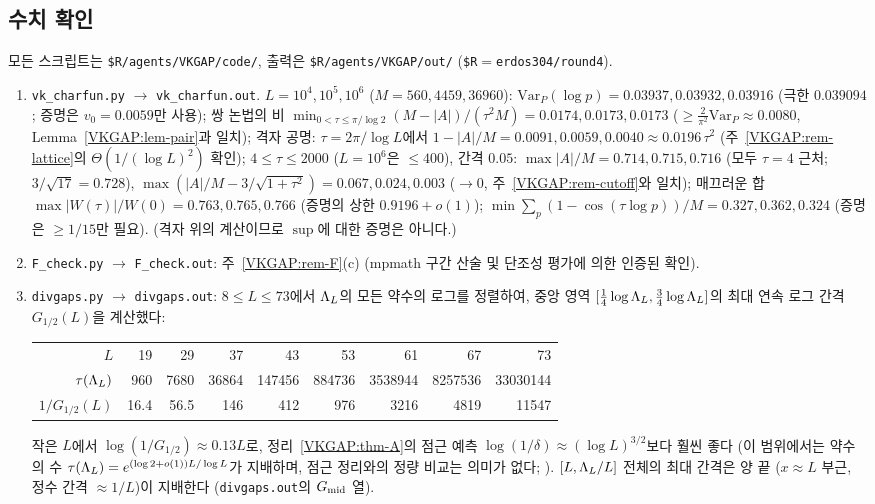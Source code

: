 \subsection{수치 확인}
\label{VKGAP:sec-num}

모든 스크립트는 \texttt{\$R/agents/VKGAP/code/}, 출력은 \texttt{\$R/agents/VKGAP/out/} (\texttt{\$R}$=$\texttt{erdos304/round4}).
\begin{enumerate}[label=(N\arabic*)]
\item \NUMERIC{} \texttt{vk\_charfun.py} $\to$ \texttt{vk\_charfun.out}. $L=10^4,10^5,10^6$ ($M=560,4459,36960$):
$\mathrm{Var}_P(\log p)=0.03937,0.03932,0.03916$ (극한 $0.039094$; 증명은 $v_0=0.0059$만 사용);
쌍 논법의 비 $\min_{0<\tau\le\pi/\log2}(M-|A|)/(\tau^2M)=0.0174,0.0173,0.0173$ ($\ge\frac2{\pi^2}\mathrm{Var}_P\approx0.0080$, Lemma~\ref{VKGAP:lem-pair}과 일치);
격자 공명: $\tau=2\pi/\log L$에서 $1-|A|/M=0.0091,0.0059,0.0040\approx0.0196\,\tau^2$ (주~\ref{VKGAP:rem-lattice}의 $\Theta(1/(\log L)^2)$ 확인);
$4\le\tau\le2000$ ($L=10^6$은 $\le400$), 간격 $0.05$: $\max|A|/M=0.714,0.715,0.716$ (모두 $\tau=4$ 근처; $3/\sqrt{17}=0.728$),
$\max(|A|/M-3/\sqrt{1+\tau^2})=0.067,0.024,0.003$ ($\to0$, 주~\ref{VKGAP:rem-cutoff}와 일치);
매끄러운 합 $\max|W(\tau)|/W(0)=0.763,0.765,0.766$ (증명의 상한 $0.9196+o(1)$);
$\min\sum_{p}(1-\cos(\tau\log p))/M=0.327,0.362,0.324$ (증명은 $\ge1/15$만 필요).
(격자 위의 계산이므로 $\sup$에 대한 증명은 아니다.)
\item \NUMERIC{} \texttt{F\_check.py} $\to$ \texttt{F\_check.out}: 주~\ref{VKGAP:rem-F}(c) (mpmath 구간 산술 및 단조성 평가에 의한 인증된 확인).
\item \NUMERIC{} \texttt{divgaps.py} $\to$ \texttt{divgaps.out}: $8\le L\le73$에서 $\Lambda_L$의 모든 약수의 로그를 정렬하여,
중앙 영역 $[\frac14\log\Lambda_L,\frac34\log\Lambda_L]$의 최대 연속 로그 간격 $G_{1/2}(L)$을 계산했다:
\begin{center}\small
\begin{tabular}{rrrrrrrrr}
\toprule
$L$ & 19 & 29 & 37 & 43 & 53 & 61 & 67 & 73\\
$\tau(\Lambda_L)$ & 960 & 7680 & 36864 & 147456 & 884736 & 3538944 & 8257536 & 33030144\\
$1/G_{1/2}(L)$ & 16.4 & 56.5 & 146 & 412 & 976 & 3216 & 4819 & 11547\\
\bottomrule
\end{tabular}
\end{center}
작은 $L$에서 $\log(1/G_{1/2})\approx0.13L$로, 정리~\ref{VKGAP:thm-A}의 점근 예측 $\log(1/\delta)\approx(\log L)^{3/2}$보다 훨씬 좋다
(이 범위에서는 약수의 수 $\tau(\Lambda_L)=e^{(\log2+o(1))L/\log L}$가 지배하며, 점근 정리와의 정량 비교는 의미가 없다; \HEUR).
$[L,\Lambda_L/L]$ 전체의 최대 간격은 양 끝 ($x\approx L$ 부근, 정수 간격 $\approx1/L$)이 지배한다 (\texttt{divgaps.out}의 $G_{\rm mid}$ 열).
\end{enumerate}


